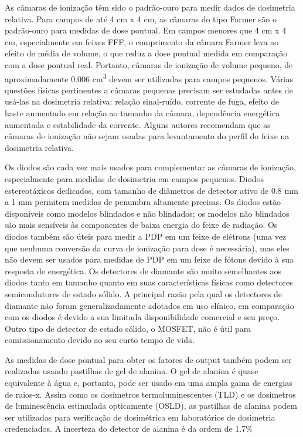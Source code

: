 \documentclass[11pt,a4paper]{article}
\begin{document}
	As câmaras de ionização têm sido o padrão-ouro para medir dados de dosimetria relativa. Para campos de até 4 cm x 4 cm, as câmaras do tipo Farmer são o padrão-ouro para medidas de dose pontual. Em campos menores que 4 cm x 4 cm, especialmente em feixes FFF, o comprimento da câmara Farmer leva ao efeito de média de volume, o que reduz a dose pontual medida em comparação com a dose pontual real. Portanto, câmaras de ionização de volume pequeno, de aproximadamente 0.006 \unit{cm^3} devem ser utilizadas para campos pequenos. Várias questões físicas pertinentes a câmaras pequenas precisam ser estudadas antes de usá-las na dosimetria relativa: relação sinal-ruído, corrente de fuga, efeito de haste aumentado em relação ao tamanho da câmara, dependência energética aumentada e estabilidade da corrente. Alguns autores recomendam que as câmaras de ionização não sejam usadas para levantamento do perfil do feixe na dosimetria relativa.

	Os diodos são cada vez mais usados para complementar as câmaras de ionização, especialmente para medidas de dosimetria em campos pequenos. Diodos estereotáxicos dedicados, com tamanho de diâmetros de detector ativo de 0.8 mm a 1 mm permitem medidas de penumbra altamente precisas. Os diodos estão disponíveis como modelos blindados e não blindados; os modelos não blindados são mais sensíveis às componentes de baixa energia do feixe de radiação. Os diodos também são úteis para medir a PDP em um feixe de elétrons (uma vez que nenhuma conversão da curva de ionização para dose é necessária), mas eles não devem ser usados para medidas de PDP em um feixe de fótons devido à sua resposta de energética. Os detectores de diamante são muito semelhantes aos diodos tanto em tamanho quanto em suas características físicas como detectores semicondutores de estado sólido. A principal razão pela qual os detectores de diamante não foram generalizadamente adotados em uso clínico, em comparação com os diodos é devido a sua limitada disponibilidade comercial e seu preço. Outro tipo de detector de estado sólido, o MOSFET, não é útil para comissionamento devido ao seu curto tempo de vida.


	As medidas de dose pontual para obter os fatores de output também podem ser realizadas usando pastilhas de gel de alanina. O gel de alanina é quase equivalente à água e, portanto, pode ser usado em uma ampla gama de energias de raios-x. Assim como os dosímetros termoluminescentes (TLD) e os dosímetros de luminescência estimulada opticamente (OSLD), as pastilhas de alanina podem ser utilizadas para verificação de dosimétrica em laboratórios de dosimetria credenciados. A incerteza do detector de alanina é da ordem de 1.7\%
\end{document}
